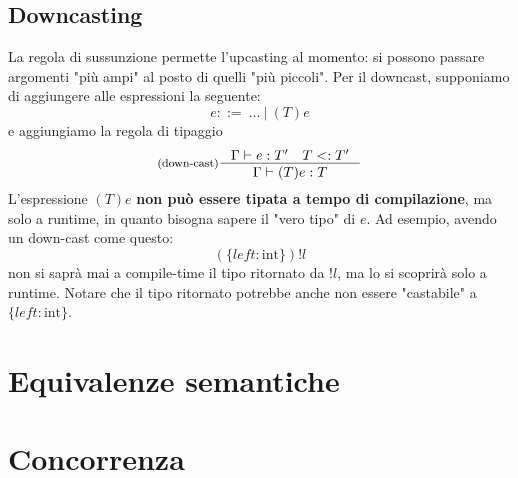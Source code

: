 \documentclass[a4paper, 11pt]{article}
\newcommand{\type}{\Gamma \vdash}
\begin{document}
\subsection{Downcasting}
La regola di sussunzione permette l'upcasting al momento: si possono passare argomenti "più ampi" al posto di quelli "più piccoli". Per il downcast, supponiamo di aggiungere alle espressioni la seguente:
\[
	e::=\ \dots\ |\ (T)e
\]
 e aggiungiamo la regola di tipaggio \[ \inference[(down-cast)]{\type e:T' \quad T<: T'}{\type (T)e:T } \]
 L'espressione $(T)e$ \textbf{non può essere tipata a tempo di compilazione}, ma solo a runtime, in quanto bisogna sapere il "vero tipo" di $e$. Ad esempio, avendo un down-cast come questo: \[ (\lbrace left:\text{int} \rbrace) !l\] non si saprà mai a compile-time il tipo ritornato da $!l$, ma lo si scoprirà solo a runtime. Notare che il tipo ritornato potrebbe anche non essere "castabile" a $\lbrace left:\text{int} \rbrace$.



















\newpage

\section{Equivalenze semantiche}

\section{Concorrenza}
\end{document}
